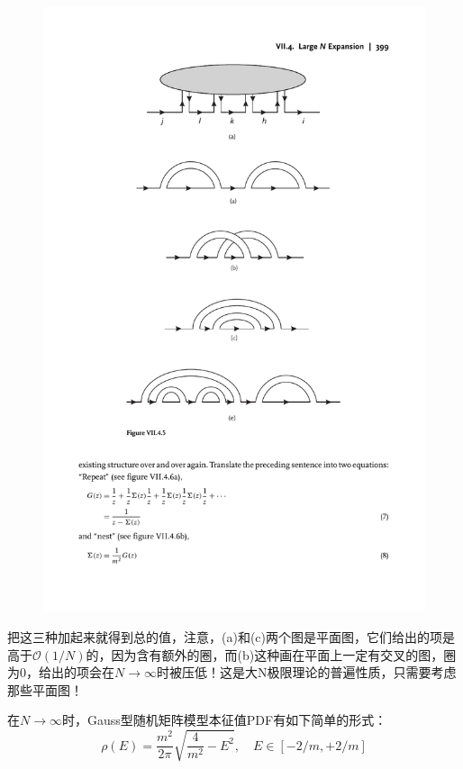 \begin{example}
\begin{figure}[H]
		\includegraphics{figs/fig9.pdf}
	\end{figure}
	把这三种加起来就得到总的值，注意，(a)和(c)两个图是平面图，它们给出的项是高于$\mathcal{O}(1/N)$的，因为含有额外的圈，而(b)这种画在平面上一定有交叉的图，圈为0，给出的项会在$N\to\infty$时被压低！这是大N极限理论的普遍性质，只需要考虑那些平面图！
\end{example}
\begin{theorem}[魏格纳半圆定律]
	在$N\to\infty$时，Gauss型随机矩阵模型本征值PDF有如下简单的形式：
	\begin{equation}
		\rho(E)=\frac{m^2}{2\pi}\sqrt{\frac4{m^2}-E^2},\quad E\in[-2/m,+2/m]
	\end{equation}
\end{theorem}
